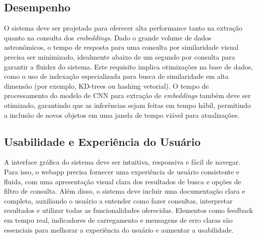 \subsection{Desempenho}
\label{sec:req-desempenho}

O sistema deve ser projetado para oferecer alta performance tanto na extração quanto na consulta dos \emph{embeddings}. Dado o grande volume de dados astronômicos, o tempo de resposta para uma consulta por similaridade visual precisa ser minimizado, idealmente abaixo de um segundo por consulta para garantir a fluidez do sistema. Este requisito implica otimizações na base de dados, como o uso de indexação especializada para busca de similaridade em alta dimensão (por exemplo, KD-trees ou hashing vetorial). O tempo de processamento do modelo de CNN para extração de \emph{embeddings} também deve ser otimizado, garantindo que as inferências sejam feitas em tempo hábil, permitindo a inclusão de novos objetos em uma janela de tempo viável para atualizações.







\subsection{Usabilidade e Experiência do Usuário}
\label{sec:req-ux}

A interface gráfica do sistema deve ser intuitiva, responsiva e fácil de navegar. Para isso, o webapp precisa fornecer uma experiência de usuário consistente e fluida, com uma apresentação visual clara dos resultados de busca e opções de filtro de consulta. Além disso, o sistema deve incluir uma documentação clara e completa, auxiliando o usuário a entender como fazer consultas, interpretar resultados e utilizar todas as funcionalidades oferecidas. Elementos como feedback em tempo real, indicadores de carregamento e mensagens de erro claras são essenciais para melhorar a experiência do usuário e aumentar a usabilidade.

